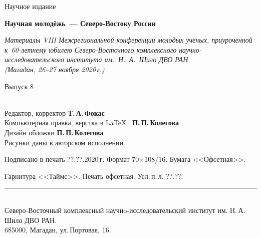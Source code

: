 \thispagestyle{empty}
\hspace{2cm}
\vfill
\begin{center}
  {Научное издание}

  \medskip
  \bigskip
  \textbf{\large Научная молодёжь~--- Северо-Востоку России}

  \medskip
  \textit{Материалы VIII Межрегиональной конференции молодых учёных, приуроченной к~60-летнему юбилею 
  Северо-Восточного комплексного научно-исследовательского института им.~Н.~А.~Шило ДВО РАН\\ (Магадан,
  26--27 ноября 2020\,г.)}

  \vfill
  Выпуск 8
\end{center}
\vfill

\hspace{2cm}\\ \small
Редактор, корректор \textbf{Т.\,А.\,Фокас}\\
Компьютерная правка, верстка в \LaTeX~ \textbf{П.\,П.\,Колегова}\\
Дизайн обложки \textbf{П.\,П.\,Колегова}\\
Рисунки даны в авторском исполнении.

\vfill

\enlargethispage{5\baselineskip}
\begin{changemargin}{-2cm}{-2cm}
\begin{center}
  \footnotesize
  Подписано в печать ??.??.2020\,г.  Формат 70$\times$108/16. Бумага
  <<Офсетная>>.\hspace*{2em}

  Гарнитура <<Таймс>>. Печать офсетная.  Усл.\,п.\,л. ??.??.
  \rule{1.1\textwidth}{.1mm}\\
  Северо-Восточный комплексный научнo-исследовательский институт им.
  Н.\,А.\,Шило ДВО РАН. \\ 685000, Магадан, ул.\,Портовая, 16.
\end{center}
\end{changemargin}
